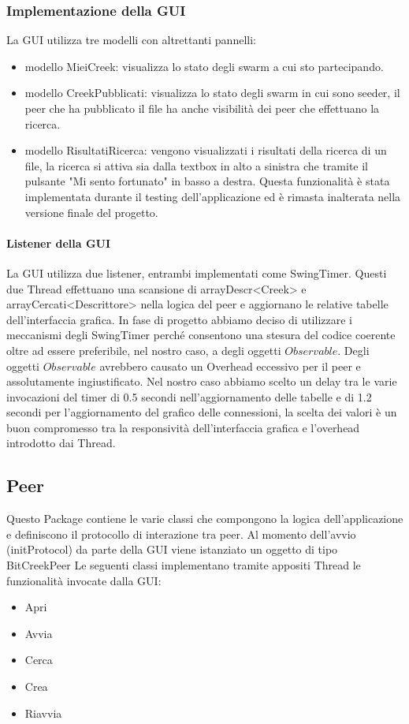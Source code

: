 \subsubsection{Implementazione della GUI}

La GUI utilizza tre modelli con altrettanti pannelli:
\begin{itemize}
\item modello MieiCreek: visualizza lo stato degli swarm a cui sto partecipando.
\item modello CreekPubblicati: visualizza lo stato degli swarm in cui sono seeder, il peer che ha pubblicato il file ha anche visibilit\`a dei peer che effettuano la ricerca.
\item modello RisultatiRicerca: vengono visualizzati i risultati della ricerca di un file, la ricerca si attiva sia dalla textbox in alto a sinistra che tramite il pulsante "Mi sento fortunato" in basso a destra. Questa funzionalit\`a \`e stata implementata durante il testing dell'applicazione ed \`e rimasta inalterata nella versione finale del progetto.
\end{itemize}

\paragraph{Listener della GUI}
La GUI utilizza due listener, entrambi implementati come SwingTimer. Questi due Thread effettuano una scansione di arrayDescr<Creek> e arrayCercati<Descrittore> nella logica del peer e aggiornano le relative tabelle dell'interfaccia grafica.
In fase di progetto abbiamo deciso di utilizzare i meccanismi degli SwingTimer perch\'e consentono una stesura del codice coerente oltre ad essere preferibile, nel nostro caso, a degli oggetti $Observable$. Degli oggetti $Observable$ avrebbero causato un Overhead eccessivo per il peer e assolutamente ingiustificato. Nel nostro caso abbiamo scelto un delay tra le varie invocazioni del timer di 0.5 secondi nell'aggiornamento delle tabelle e di 1.2 secondi per l'aggiornamento del grafico delle connessioni, la scelta dei valori \`e un buon compromesso tra la responsivit\`a dell'interfaccia grafica e l'overhead introdotto dai Thread.

\subsection{Peer}

Questo Package contiene le varie classi che compongono la logica dell'applicazione e definiscono il protocollo di interazione tra peer.
Al momento dell'avvio (initProtocol) da parte della GUI viene istanziato un oggetto di tipo BitCreekPeer
Le seguenti classi implementano tramite appositi Thread le funzionalit\`a invocate dalla GUI:
\begin{itemize}
\item Apri
\item Avvia
\item Cerca
\item Crea
\item Riavvia
\end{itemize}